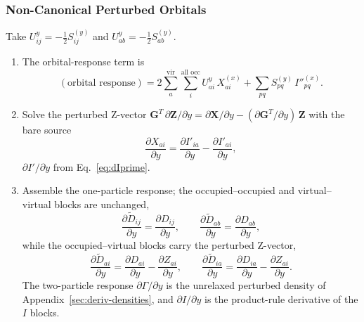 \documentclass[12pt]{article}
\newcommand{\vir}{\text{vir}}
\newcommand{\alloc}{\text{all occ}}   %
\begin{document}
\subsubsection{Non-Canonical Perturbed Orbitals}
Take $U^y_{ij}=-\tfrac12 S^{(y)}_{ij}$ and $U^y_{ab}=-\tfrac12 S^{(y)}_{ab}$.
\begin{enumerate}
\item The orbital-response term is
\begin{equation*}
(\text{orbital response}) =
2\sum_{a}^{\vir}\sum_{i}^{\alloc}U^y_{ai}\,X^{(x)}_{ai}
+ \sum_{pq}S^{(y)}_{pq}\,I''^{(x)}_{pq}.
\end{equation*}
\item Solve the perturbed Z-vector
$\mathbf{G}^{T}\,\partial\mathbf{Z}/\partial y
=\partial\mathbf{X}/\partial y-(\partial\mathbf{G}^{T}/\partial y)\,\mathbf{Z}$
with the bare source
\begin{equation*}
\frac{\partial X_{ai}}{\partial y}
=\frac{\partial I'_{ia}}{\partial y}-\frac{\partial I'_{ai}}{\partial y},
\end{equation*}
$\partial I'/\partial y$ from Eq.~\eqref{eq:dIprime}.
\item Assemble the one-particle response; the occupied--occupied and
virtual--virtual blocks are unchanged,
\begin{equation*}
\frac{\partial\tilde D_{ij}}{\partial y}=\frac{\partial D_{ij}}{\partial y},\qquad
\frac{\partial\tilde D_{ab}}{\partial y}=\frac{\partial D_{ab}}{\partial y},
\end{equation*}
while the occupied--virtual blocks carry the perturbed Z-vector,
\begin{equation*}
\frac{\partial\tilde D_{ai}}{\partial y}=\frac{\partial D_{ai}}{\partial y}-\frac{\partial Z_{ai}}{\partial y},\qquad
\frac{\partial\tilde D_{ia}}{\partial y}=\frac{\partial D_{ia}}{\partial y}-\frac{\partial Z_{ai}}{\partial y}.
\end{equation*}
The two-particle response $\partial\Gamma/\partial y$ is the unrelaxed perturbed
density of Appendix~\ref{sec:deriv-densities}, and $\partial I/\partial y$ is the
product-rule derivative of the $I$ blocks.
\end{enumerate}
\end{document}

